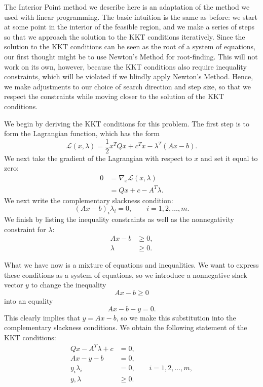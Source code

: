 The Interior Point method we describe here is an adaptation of the method we used with linear
programming. The basic intuition is the same as before: we start at some point in the interior of the
feasible region, and we make a series of steps so that we approach the solution to the KKT conditions
iteratively. Since the solution to the KKT conditions can be seen as the root of a system of equations,
our first thought might be to use Newton's Method for root-finding. This will not work on its own, however,
because the KKT conditions also require inequality constraints, which will be violated if we blindly apply
Newton's Method. Hence, we make adjustments to our choice of search direction and step size, so that we
respect the constraints while moving closer to the solution of the KKT conditions.

We begin by deriving the KKT conditions for this problem. The first step is to form the Lagrangian function,
which has the form
\[
\mathcal{L}(x,\lambda) = \frac{1}{2}x^TQx + c^Tx - \lambda^T(Ax -b).
\]
We next take the gradient of the Lagrangian with respect to $x$ and set it equal to zero:
\begin{align*}
0 &= \nabla_x \mathcal{L}(x,\lambda)\\
&= Qx + c - A^T\lambda.
\end{align*}
We next write the complementary slackness condition:
\[
(Ax - b)_i\lambda_i = 0, \qquad i=1,2,\ldots,m.
\]
We finish by listing the inequality constraints as well as the nonnegativity constraint for $\lambda$:
\begin{align*}
Ax - b &\geq 0,\\
\lambda &\geq 0.
\end{align*}

What we have now is a mixture of equations and inequalities. We want to express these conditions as a system of equations,
so we introduce a nonnegative slack vector $y$ to change the inequality
\[
Ax - b \geq 0
\]
into an equality
\[
Ax - b - y = 0.
\]
This clearly implies that $y = Ax - b$, so we make this substitution into the complementary slackness conditions.
We obtain the following statement of the KKT conditions:
\begin{align*}
Qx - A^T\lambda + c &= 0,\\
Ax - y - b &= 0,\\
y_i\lambda_i &= 0, \qquad i=1,2,\ldots,m,\\
y,\lambda &\geq 0.
\end{align*}

